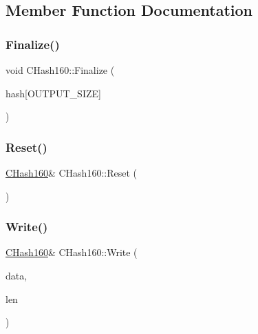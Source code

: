 \subsection{Member Function Documentation}
\mbox{\label{class_c_hash160_a9bb08e1772002ae1a5d85017ba7952ee}} 
\subsubsection{\texorpdfstring{Finalize()}{Finalize()}}
{\footnotesize\ttfamily void C\+Hash160\+::\+Finalize (\begin{DoxyParamCaption}\item[{unsigned char}]{hash\mbox{[}\+O\+U\+T\+P\+U\+T\+\_\+\+S\+I\+Z\+E\mbox{]} }\end{DoxyParamCaption})\hspace{0.3cm}{\ttfamily [inline]}}

\mbox{\label{class_c_hash160_a971a8d59073455b1ef0ac0f65e964772}} 
\subsubsection{\texorpdfstring{Reset()}{Reset()}}
{\footnotesize\ttfamily \mbox{\hyperlink{class_c_hash160}{C\+Hash160}}\& C\+Hash160\+::\+Reset (\begin{DoxyParamCaption}{ }\end{DoxyParamCaption})\hspace{0.3cm}{\ttfamily [inline]}}

\mbox{\label{class_c_hash160_af56cdd9443013eb68b246aa8450217f2}} 
\subsubsection{\texorpdfstring{Write()}{Write()}}
{\footnotesize\ttfamily \mbox{\hyperlink{class_c_hash160}{C\+Hash160}}\& C\+Hash160\+::\+Write (\begin{DoxyParamCaption}\item[{const unsigned char $\ast$}]{data,  }\item[{size\+\_\+t}]{len }\end{DoxyParamCaption})\hspace{0.3cm}{\ttfamily [inline]}}



